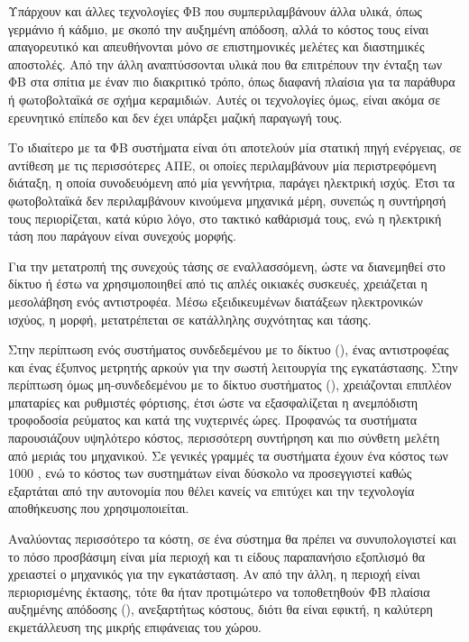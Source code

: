\documentclass[12pt]{report}
\begin{document}
Υπάρχουν και άλλες τεχνολογίες ΦΒ που συμπεριλαμβάνουν άλλα υλικά, όπως γερμάνιο ή κάδμιο, με σκοπό την αυξημένη απόδοση, αλλά το κόστος τους είναι απαγορευτικό και απευθήνονται μόνο σε επιστημονικές μελέτες και διαστημικές
αποστολές. Από την άλλη αναπτύσσονται υλικά που θα επιτρέπουν την ένταξη των ΦΒ στα σπίτια με έναν πιο διακριτικό τρόπο, όπως διαφανή πλαίσια για τα παράθυρα ή φωτοβολταϊκά σε σχήμα κεραμιδιών. Αυτές οι τεχνολογίες όμως, είναι
ακόμα σε ερευνητικό επίπεδο και δεν έχει υπάρξει μαζική παραγωγή τους.

Το ιδιαίτερο με τα ΦΒ συστήματα είναι ότι αποτελούν μία στατική πηγή ενέργειας, σε αντίθεση με τις περισσότερες ΑΠΕ, οι οποίες περιλαμβάνουν μία περιστρεφόμενη διάταξη, η οποία συνοδευόμενη από μία γεννήτρια, παράγει ηλεκτρική
ισχύς. Έτσι τα φωτοβολταϊκά δεν περιλαμβάνουν κινούμενα μηχανικά μέρη, συνεπώς η συντήρησή τους περιορίζεται, κατά κύριο λόγο, στο τακτικό καθάρισμά τους, ενώ η ηλεκτρική τάση που παράγουν είναι συνεχούς μορφής.

Για την μετατροπή της συνεχούς τάσης σε εναλλασσόμενη, ώστε να διανεμηθεί στο δίκτυο ή έστω να χρησιμοποιηθεί από τις απλές οικιακές συσκευές, χρειάζεται η μεσολάβηση ενός αντιστροφέα. Μέσω εξειδικευμένων διατάξεων ηλεκτρονικών
ισχύος, η {} μορφή, μετατρέπεται σε {} κατάλληλης συχνότητας και τάσης. 

Στην περίπτωση ενός συστήματος συνδεδεμένου με το δίκτυο ({}), ένας αντιστροφέας και ένας έξυπνος μετρητής αρκούν για την σωστή λειτουργία της εγκατάστασης. Στην περίπτωση όμως μη-συνδεδεμένου με το δίκτυο
συστήματος ({}), χρειάζονται επιπλέον μπαταρίες και ρυθμιστές φόρτισης, έτσι ώστε να εξασφαλίζεται η ανεμπόδιστη τροφοδοσία ρεύματος και κατά της νυχτερινές ώρες. Προφανώς τα {}
συστήματα παρουσιάζουν υψηλότερο κόστος, περισσότερη συντήρηση και πιο σύνθετη μελέτη από μεριάς του μηχανικού. Σε γενικές γραμμές τα {} συστήματα έχουν ένα κόστος των 1000 {}, ενώ το κόστος των
{} συστημάτων είναι δύσκολο να προσεγγιστεί καθώς εξαρτάται από την αυτονομία που θέλει κανείς να επιτύχει και την τεχνολογία αποθήκευσης που χρησιμοποιείται.

Αναλύοντας περισσότερο τα κόστη, σε ένα σύστημα θα πρέπει να συνυπολογιστεί και το πόσο προσβάσιμη είναι μία περιοχή και τι είδους παραπανήσιο εξοπλισμό θα χρειαστεί ο μηχανικός για την εγκατάσταση. 
Αν από την άλλη, η περιοχή είναι περιορισμένης έκτασης, τότε θα ήταν προτιμώτερο να τοποθετηθούν ΦΒ πλαίσια αυξημένης απόδοσης ({}), ανεξαρτήτως κόστους, διότι θα είναι εφικτή, η καλύτερη εκμετάλλευση 
της μικρής επιφάνειας του χώρου. 
\end{document}
